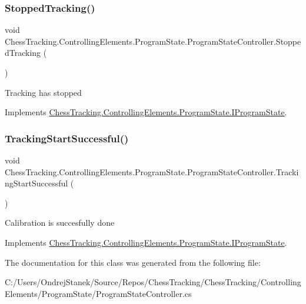 \subsubsection{\texorpdfstring{StoppedTracking()}{StoppedTracking()}}
{\footnotesize\ttfamily void Chess\+Tracking.\+Controlling\+Elements.\+Program\+State.\+Program\+State\+Controller.\+Stopped\+Tracking (\begin{DoxyParamCaption}{ }\end{DoxyParamCaption})}



Tracking has stopped 



Implements \mbox{\hyperlink{interface_chess_tracking_1_1_controlling_elements_1_1_program_state_1_1_i_program_state_aa8c051432b41c20be372d050635d84af}{Chess\+Tracking.\+Controlling\+Elements.\+Program\+State.\+I\+Program\+State}}.

\mbox{\label{class_chess_tracking_1_1_controlling_elements_1_1_program_state_1_1_program_state_controller_a029929ed04eab54893eaed751f7bcae2}} 
\subsubsection{\texorpdfstring{TrackingStartSuccessful()}{TrackingStartSuccessful()}}
{\footnotesize\ttfamily void Chess\+Tracking.\+Controlling\+Elements.\+Program\+State.\+Program\+State\+Controller.\+Tracking\+Start\+Successful (\begin{DoxyParamCaption}{ }\end{DoxyParamCaption})}



Calibration is succesfully done 



Implements \mbox{\hyperlink{interface_chess_tracking_1_1_controlling_elements_1_1_program_state_1_1_i_program_state_ae544420adecf8b0f6a58863cb3f89b1a}{Chess\+Tracking.\+Controlling\+Elements.\+Program\+State.\+I\+Program\+State}}.



The documentation for this class was generated from the following file\+:\begin{DoxyCompactItemize}
\item 
C\+:/\+Users/\+Ondrej\+Stanek/\+Source/\+Repos/\+Chess\+Tracking/\+Chess\+Tracking/\+Controlling\+Elements/\+Program\+State/Program\+State\+Controller.\+cs\end{DoxyCompactItemize}
